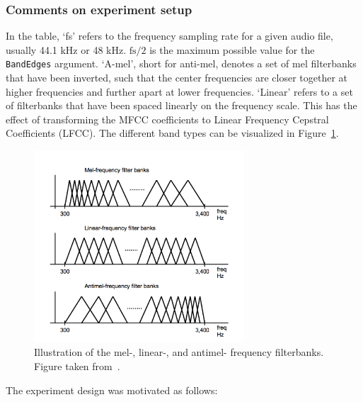 \subsubsection{Comments on experiment setup}

In the table, `fs' refers to the frequency sampling rate for a given audio file,
usually 44.1 kHz or 48 kHz. $\text{fs}/2$ is the maximum possible value for the
\texttt{BandEdges} argument. `A-mel', short for anti-mel, denotes a set of mel
filterbanks that have been inverted, such that the center frequencies are closer
together at higher frequencies and further apart at lower frequencies. `Linear'
refers to a set of filterbanks that have been spaced linearly on the frequency
scale. This has the effect of transforming the MFCC coefficients to Linear
Frequency Cepstral Coefficients (LFCC). The different band types can be
visualized in Figure~\ref{fig:filterbanks}.

\begin{figure}[ht]
  \centering
  \includegraphics[width=0.7\textwidth]{figures/filterbanks.png}
  \caption{Illustration of the mel-, linear-, and antimel- frequency
  filterbanks. Figure taken from~\cite{lei2009mel}.}\label{fig:filterbanks}
\end{figure}

The experiment design was motivated as follows:

